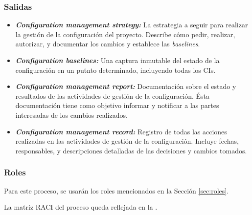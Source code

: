 \subsubsection{Salidas}
\begin{itemize}
  \item \textbf{\textit{Configuration management strategy:}} La estrategia a seguir para realizar la gestión de la configuración del proyecto. Describe cómo pedir, realizar, autorizar, y documentar los cambios y establece las \textit{baselines}.
  \item \textbf{\textit{Configuration baselines:}} Una captura inmutable del estado de la configuración en un putnto determinado, incluyendo todas los CIs.
  \item \textbf{\textit{Configuration management report:}} Documentación sobre el estado y resultados de las actividades de gestión de la configuración. Ésta documentación tiene como objetivo informar y notificar a las partes interesadas de los cambios realizados.
  \item \textbf{\textit{Configuration management record:}} Registro de todas las acciones realizadas en las actividades de gestión de la configuración. Incluye fechas, responsables, y descripciones detalladas de las decisiones y cambios tomados.
\end{itemize}


\subsubsection{Roles}
Para este proceso, se usarán los roles mencionados en la Sección \ref{sec:roles}.

\noindent
La matriz RACI del proceso queda reflejada en la .

